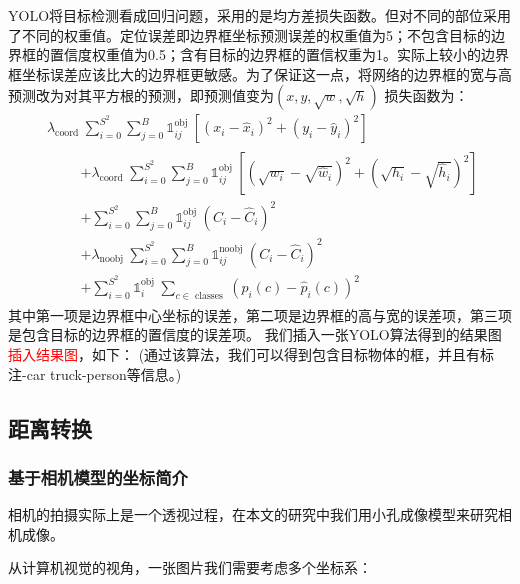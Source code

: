 YOLO将目标检测看成回归问题，采用的是均方差损失函数。但对不同的部位采用了不同的权重值。定位误差即边界框坐标预测误差的权重值为5；不包含目标的边界框的置信度权重值为0.5；含有目标的边界框的置信权重为1。实际上较小的边界框坐标误差应该比大的边界框更敏感。为了保证这一点，将网络的边界框的宽与高预测改为对其平方根的预测，即预测值变为$(x,y,{\sqrt{w}},\sqrt{h})$
损失函数为：
\begin{equation}
    \begin{aligned}
        &\lambda_{\text {coord }} \sum_{i=0}^{S^{2}} \sum_{j=0}^{B} \mathbb{1}_{i j}^{\text {obj }}\left[\left(x_{i}-\hat{x}_{i}\right)^{2}+\left(y_{i}-\hat{y}_{i}\right)^{2}\right] \\
        &\qquad \begin{aligned}
                    +\lambda_{\text {coord }} \sum_{i=0}^{S^{2}} \sum_{j=0}^{B} \mathbb{1}_{i j}^{\text {obj }}\left[\left(\sqrt{w_{i}}-\sqrt{\hat{w}_{i}}\right)^{2}+\left(\sqrt{h_{i}}-\sqrt{\hat{h}_{i}}\right)^{2}\right] \\
                    +\sum_{i=0}^{S^{2}} \sum_{j=0}^{B} \mathbb{1}_{i j}^{\text {obj }}\left(C_{i}-\hat{C}_{i}\right)^{2} \\
                    +\lambda_{\text {noobj }} \sum_{i=0}^{S^{2}} \sum_{j=0}^{B} \mathbb{1}_{i j}^{\text {noobj }}\left(C_{i}-\hat{C}_{i}\right)^{2} \\
                    +\sum_{i=0}^{S^{2}} \mathbb{1}_{i}^{\text {obj }} \sum_{c \in \text { classes }}\left(p_{i}(c)-\hat{p}_{i}(c)\right)^{2}
        \end{aligned}
    \end{aligned}
\end{equation}
其中第一项是边界框中心坐标的误差，第二项是边界框的高与宽的误差项，第三项是包含目标的边界框的置信度的误差项。
我们插入一张YOLO算法得到的结果图\textcolor{red}{插入结果图}，如下：
(通过该算法，我们可以得到包含目标物体的框，并且有标注-car truck-person等信息。)

\subsection{距离转换}

\subsubsection{基于相机模型的坐标简介}
相机的拍摄实际上是一个透视过程，在本文的研究中我们用小孔成像模型来研究相机成像。

从计算机视觉的视角，一张图片我们需要考虑多个坐标系：

